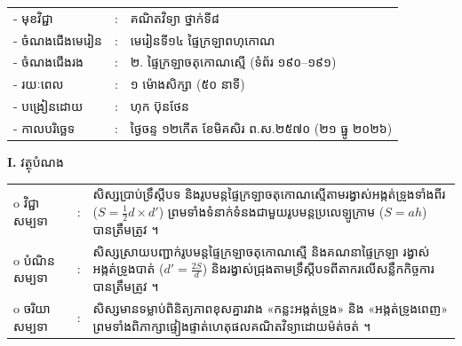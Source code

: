 \documentclass[a4paper,10pt]{article}
\newcommand{\wcirc}{{\CourierNew\selectfont o}}
\begin{document}
{\renewcommand{\arraystretch}{0.98}
\hspace*{4.05cm}%
\begin{tabular}{@{}l l l@{}}
  - \hspace{0.35cm} មុខវិជ្ជា & : & គណិតវិទ្យា ថ្នាក់ទី៨ \\
  - \hspace{0.35cm} ចំណងជើងមេរៀន & : & មេរៀនទី១៤ ផ្ទៃក្រឡាពហុកោណ \\
  - \hspace{0.35cm} ចំណងជើងរង & : & ២. ផ្ទៃក្រឡាចតុកោណស្មើ (ទំព័រ ១៩០--១៩១) \\
  - \hspace{0.35cm} រយៈពេល & : & ១ ម៉ោងសិក្សា (៥០ នាទី) \\
  - \hspace{0.35cm} បង្រៀនដោយ & : & ហុក ប៊ុនថែន \\
  - \hspace{0.35cm} កាលបរិច្ឆេទ & : & ថ្ងៃចន្ទ ១២កើត ខែមិគសិរ ព.ស.២៥៧០ (២១ ធ្នូ ២០២៦) \\
\end{tabular}

\vspace{2pt}

\textbf{I.} {\muol វត្ថុបំណង}\\[1pt]
\hspace*{0.55cm}%
\begin{tabular}{@{}l l L{14.2cm}@{}}
  \wcirc \hspace{0.25cm} វិជ្ជាសម្បទា & : & សិស្សប្រាប់ទ្រឹស្ដីបទ និងរូបមន្តផ្ទៃក្រឡាចតុកោណស្មើតាមរង្វាស់អង្កត់ទ្រូងទាំងពីរ ($S = \frac{1}{2} d \times d'$) ព្រមទាំងទំនាក់ទំនងជាមួយរូបមន្តប្រលេឡូក្រាម ($S = ah$) បានត្រឹមត្រូវ ។ \\
  \wcirc \hspace{0.25cm} បំណិនសម្បទា & : & សិស្សស្រាយបញ្ជាក់រូបមន្តផ្ទៃក្រឡាចតុកោណស្មើ និងគណនាផ្ទៃក្រឡា រង្វាស់អង្កត់ទ្រូងបាត់ ($d' = \frac{2S}{d}$) និងរង្វាស់ជ្រុងតាមទ្រឹស្ដីបទពីតាករលើសន្លឹកកិច្ចការបានត្រឹមត្រូវ ។ \\
  \wcirc \hspace{0.25cm} ចរិយាសម្បទា & : & សិស្សមានទម្លាប់ពិនិត្យភាពខុសគ្នារវាង «កន្លះអង្កត់ទ្រូង» និង «អង្កត់ទ្រូងពេញ» ព្រមទាំងពិភាក្សាផ្ទៀងផ្ទាត់ហេតុផលគណិតវិទ្យាដោយម៉ត់ចត់ ។ \\
\end{tabular}

\vspace{2pt}

}
\end{document}
